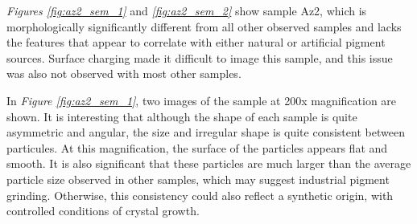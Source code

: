 \textit{Figures \ref{fig:az2_sem_1}} and \textit{\ref{fig:az2_sem_2}} show sample Az2, which is morphologically significantly different from all other observed samples and lacks the features that appear to correlate with either natural or artificial pigment sources. Surface charging made it difficult to image this sample, and this issue was also not observed with most other samples.

In \textit{Figure \ref{fig:az2_sem_1}}, two images of the sample at 200x magnification are shown. It is interesting that although the shape of each sample is quite asymmetric and angular, the size and irregular shape is quite consistent between particules. At this magnification, the surface of the particles appears flat and smooth. It is also significant that these particles are much larger than the average particle size observed in other samples, which may suggest industrial pigment grinding. Otherwise, this consistency could also reflect a synthetic origin, with controlled conditions of crystal growth.


